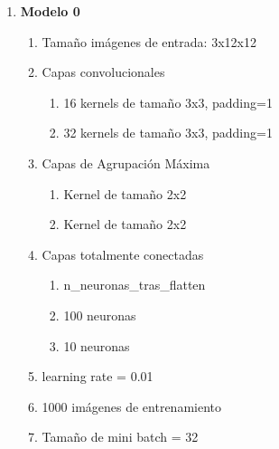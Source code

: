 \begin{enumerate}
	\item \textbf{Modelo 0}
	\begin{enumerate}[label=\textbullet, nosep]
		\item Tamaño imágenes de entrada: 3x12x12
		\item Capas convolucionales
		\begin{enumerate}[label=\textbullet, nosep]
			\item 16 kernels de tamaño 3x3, padding=1
			\item 32 kernels de tamaño 3x3, padding=1
		\end{enumerate}
		\item Capas de Agrupación Máxima
		\begin{enumerate}[label=\textbullet, nosep]
			\item Kernel de tamaño 2x2
			\item Kernel de tamaño 2x2
		\end{enumerate}
		\item Capas totalmente conectadas
		\begin{enumerate}[label=\textbullet, nosep]
			\item n\_neuronas\_tras\_flatten
			\item 100 neuronas
			\item 10 neuronas
		\end{enumerate}
		\item learning rate = 0.01
		\item 1000 imágenes de entrenamiento
		\item Tamaño de mini batch = 32
	\end{enumerate}
	

\end{enumerate}
